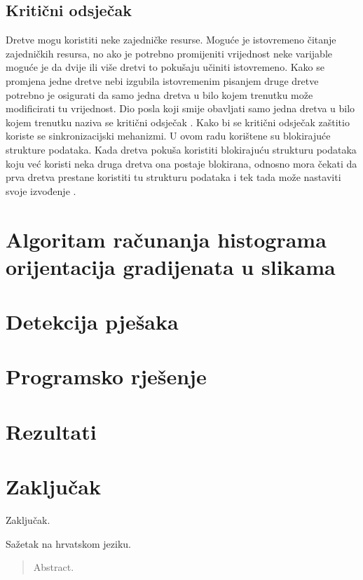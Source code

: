 \documentclass[times, utf8, zavrsni]{fer}
\begin{document}
\def\UrlBreaks{\do\/\do-}

\section{Kritični odsječak}
Dretve mogu koristiti neke zajedničke resurse. Moguće je istovremeno čitanje zajedničkih resursa, no ako je potrebno promijeniti vrijednost neke varijable moguće je da dvije ili više dretvi to pokušaju učiniti istovremeno. Kako se promjena jedne dretve nebi izgubila istovremenim pisanjem druge dretve potrebno je osigurati da samo jedna dretva u bilo kojem trenutku može modificirati tu vrijednost. Dio posla koji smije obavljati samo jedna dretva u bilo kojem trenutku naziva se kritični odsječak . Kako bi se kritični odsječak zaštitio koriste se sinkronizacijski mehanizmi. U ovom radu korištene su blokirajuće strukture podataka. Kada dretva pokuša koristiti blokirajuću strukturu podataka koju već koristi neka druga dretva ona postaje blokirana, odnosno mora čekati da prva dretva prestane koristiti tu strukturu podataka i tek tada može nastaviti svoje izvođenje \citep{os}.

\chapter{Algoritam računanja histograma orijentacija gradijenata u slikama}

\chapter{Detekcija pješaka}

\chapter{Programsko rješenje}

\chapter{Rezultati}

\chapter{Zaključak}
Zaključak.




\begin{sazetak}
Sažetak na hrvatskom jeziku.

\end{sazetak}

\begin{abstract}
Abstract.

\end{abstract}
\end{document}
